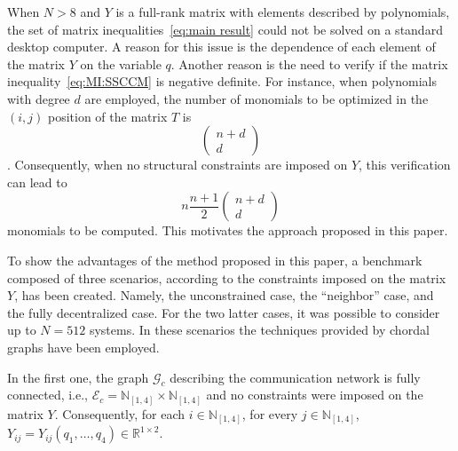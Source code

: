 \documentclass[10pt,twocolumn,twoside]{IEEEtran}
\newcounter{para}
\newcommand\mypara{\par}
\theoremstyle{plain}
\theoremstyle{definition}
\theoremstyle{remark}
\begin{document}
\mypara When $N>8$ and $Y$ is a full-rank matrix with elements described by polynomials, the set of matrix inequalities~\eqref{eq:main result} could not be solved on a standard desktop computer. A reason for this issue is the dependence of each element of the matrix $Y$ on the variable $q$. Another reason is the need to verify if the matrix inequality~\eqref{eq:MI:SSCCM} is negative definite. For instance, when  polynomials with degree $d$ are employed, the number of monomials to be optimized in the $(i,j)$ position of the matrix $T$ is
\begin{equation*}
		\begin{pmatrix}
n+d\\ d
\end{pmatrix}
\end{equation*}
\cite{Waki2006}. Consequently, when no structural constraints are imposed on $Y$, this verification can lead to
\begin{equation*}
n\dfrac{n+1}{2}\begin{pmatrix}
n+d\\ d
\end{pmatrix}
\end{equation*}
monomials to be computed. This motivates the approach proposed in this paper.

\mypara To show the advantages of the method proposed in this paper, a benchmark composed of  three scenarios, according to the constraints imposed on the matrix $Y$, has been created.  Namely, the unconstrained case, the ``neighbor'' case, and the fully decentralized case. For the two latter cases, it was possible to consider up to $N=512$ systems. In these scenarios the techniques provided by chordal graphs have been employed.

\mypara In the first one, the graph $\mathscr{G}_c$ describing the communication network is fully connected, i.e., $\mathscr{E}_c=\mathbb{N}_{[1,4]}\times\mathbb{N}_{[1,4]}$ and no constraints were imposed on the matrix $Y$. Consequently, for each $i\in\mathbb{N}_{[1,4]}$, for every $j\in\mathbb{N}_{[1,4]}$, $Y_{ij}=Y_{ij}(q_1,\ldots,q_4)\in\mathbb{R}^{1\times 2}$.
	
\end{document}

